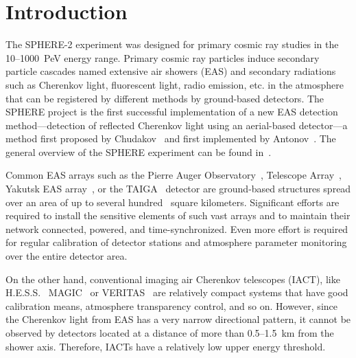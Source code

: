 \documentclass[universe,article,accept,moreauthors,pdftex]{Definitions/mdpi}
\begin{document}



\section{Introduction}
The SPHERE-2 experiment was designed for primary cosmic ray  studies in the \mbox{10--1000~PeV} energy range. Primary cosmic ray particles induce secondary particle cascades named extensive air showers (EAS) and secondary radiations such as Cherenkov light, fluorescent light, radio emission, etc. in the atmosphere that can be registered by different methods by ground-based detectors. 
The SPHERE project is the first successful implementation of a new EAS detection method---detection of reflected Cherenkov light using an aerial-based detector---a method first proposed by Chudakov~\cite{chu74:VKKL74} and first implemented by Antonov~\cite{ant75, ant86, ant97}. The general overview of the SPHERE experiment can be found in~\cite{Ant15a}.

Common EAS arrays such as the Pierre Auger Observatory~\cite{PAO2015, PAO2021}, Telescope Array~\cite{abu12}, Yakutsk EAS array~\cite{Yakutsk19}, or the TAIGA~\cite{TAIGA20} detector are ground-based structures spread over an area of up to several hundred~\cite{abu12} square kilometers. Significant efforts are required to install the sensitive elements of such vast arrays and to maintain their network connected, powered, and time-synchronized. Even more effort is required for regular calibration of detector stations and atmosphere parameter monitoring over the entire detector area. 

On the other hand, conventional imaging air Cherenkov telescopes (IACT), like H.E.S.S.~\cite{HESS03a, HESS2006} %
MAGIC~\cite{MAGIC16-1, MAGIC16-2} or VERITAS~\cite{VERITAS2002, VERITAS2009} are relatively compact systems that have good calibration means, atmosphere transparency control, and so on. However, since the Cherenkov light from EAS has a very narrow directional pattern, it cannot be observed by detectors located at a distance of more than 0.5--1.5~km from the shower axis. Therefore, IACTs have a relatively low upper energy threshold.
\end{document}
